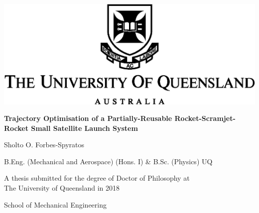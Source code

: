 
\thispagestyle{empty}

\begin{center}
  \includegraphics{figures/uq_logo}

  \vspace{50pt}

  \textbf{\Large Trajectory Optimisation of a Partially-Reusable Rocket-Scramjet-Rocket Small Satellite Launch System}

  \vspace{25pt}

  {\large Sholto O. Forbes-Spyratos}

  \vspace{5pt}

  {\large B.Eng. (Mechanical and Aerospace) (Hons. I) \& B.Sc. (Physics) UQ} \newline


  \vspace{60pt}
                                                                                                                                                                                                                                                                                                                                                                                                                                                                                                                                                                                                                                                                                                                                                                                                                                                                                                                                                                                                                                                 
  \vfill

  {\large A thesis submitted for the degree of Doctor of Philosophy at\\ The University of Queensland in 2018}

  \vspace{20pt}

  School of Mechanical Engineering

  \vfill
\end{center}

